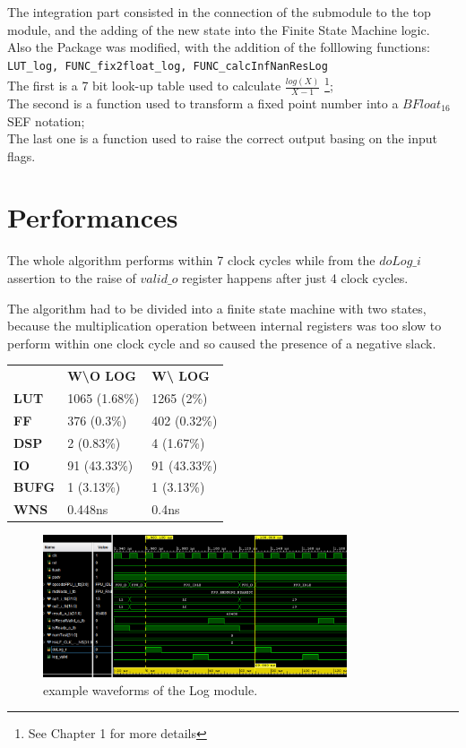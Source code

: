 \documentclass{report}
\begin{document}
The integration part consisted in the connection of the submodule to the top module, and the adding of the new state into the Finite State Machine logic.\\
Also the Package was modified, with the addition of the folllowing functions:\\
\colorbox{mygray}{\lstinline!LUT_log, FUNC_fix2float_log, FUNC_calcInfNanResLog! }
\\The first is a 7 bit look-up table used to calculate $\frac{log(X)}{X-1}$ \footnote{See Chapter 1 for more details};
\\The second is a function used to transform a fixed point number into a $BFloat_{16}$ SEF notation;
\\The last one is a function used to raise the correct output basing on the input flags. 

\bigskip
\section{Performances}

The whole algorithm performs within 7 clock cycles while from the $doLog\_i$ assertion to the raise of $valid\_o$ register happens after just 4 clock cycles.

The algorithm had to be divided into a finite state machine with two states, because the multiplication operation between internal registers was too slow to perform within one clock cycle and so caused the presence of a negative slack.

\begin{table}[htbp]
\centering
\begin{tabular}{lll}
              & \textbf{W\textbackslash{}O LOG} & \textbf{W\textbackslash{} LOG}  \\
\textbf{LUT}  & 1065 (1.68\%)          & 1265 (2\%)             \\
\textbf{FF}   & 376 (0.3\%)			   & 402 (0.32\%)               \\
\textbf{DSP}  & 2 (0.83\%)             & 4 (1.67\%)             \\
\textbf{IO}   & 91 (43.33\%)           & 91 (43.33\%)           \\
\textbf{BUFG} & 1 (3.13\%)             & 1 (3.13\%)             \\
\textbf{WNS}  & 0.448ns                & 0.4ns                 
\end{tabular}
\end{table}


\begin{figure}[h]
  \centering
    \includegraphics[width=0.8\textwidth]{images/waveforms.png}
    \caption{example waveforms of the Log module.}
\end{figure}
\end{document}
